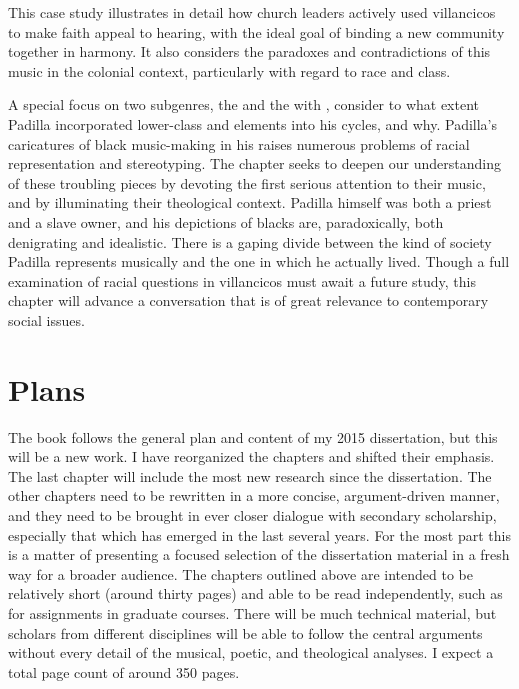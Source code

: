 \documentclass{vcbook-proposal}
\begin{document}
This case study illustrates in detail how church leaders actively used villancicos to make faith appeal to hearing, with the ideal goal of binding a new community together in harmony.
It also considers the paradoxes and contradictions of this music in the colonial context, particularly with regard to race and class.

A special focus on two subgenres, the  and the  with , consider to what extent Padilla incorporated lower-class and  elements into his cycles, and why.
Padilla's caricatures of black music-making in his  raises numerous problems of racial representation and stereotyping.
The chapter seeks to deepen our understanding of these troubling pieces by devoting the first serious attention to their music, and by illuminating their theological context.
Padilla himself was both a priest and a slave owner, and his depictions of blacks are, paradoxically, both denigrating and idealistic.
There is a gaping divide between the kind of society Padilla represents musically and the one in which he actually lived.
Though a full examination of racial questions in villancicos must await a future study, this chapter will advance a conversation that is of great relevance to contemporary social issues.


\section{Plans}

The book follows the general plan and content of my 2015 dissertation, but this will be a new work.%
  \autocite{Cashner:PhD}
I have reorganized the chapters and shifted their emphasis.
The last chapter will include the most new research since the dissertation.
The other chapters need to be rewritten in a more concise, argument-driven manner, and they need to be brought in ever closer dialogue with secondary scholarship, especially that which has emerged in the last several years.
For the most part this is a matter of presenting a focused selection of the dissertation material in a fresh way for a broader audience.
The chapters outlined above are intended to be relatively short (around thirty pages) and able to be read independently, such as for assignments in graduate courses.
There will be much technical material, but scholars from different disciplines will be able to follow the central arguments without every detail of the musical, poetic, and theological analyses.
I expect a total page count of around 350 pages.
\end{document}
